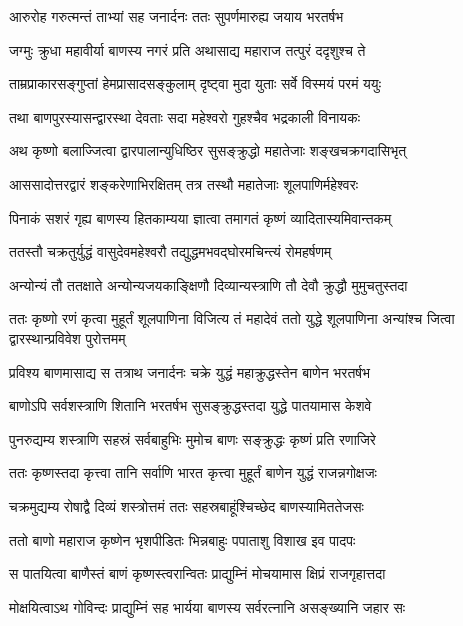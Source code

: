 \twolineshloka
{आरुरोह गरुत्मन्तं ताभ्यां सह जनार्दनः}
{ततः सुपर्णमारुह्य जयाय भरतर्षभ}


\twolineshloka
{जग्मुः क्रुधा महावीर्या बाणस्य नगरं प्रति}
{अथासाद्य महाराज तत्पुरं ददृशुश्च ते}


\twolineshloka
{ताम्रप्राकारसङ्गुप्तां हेमप्रासादसङ्कुलाम्}
{दृष्ट्वा मुदा युताः सर्वे विस्मयं परमं ययुः}


\twolineshloka
{तथा बाणपुरस्यासन्द्वारस्था देवताः सदा}
{महेश्वरो गुहश्चैव भद्रकाली विनायकः}


\twolineshloka
{अथ कृष्णो बलाज्जित्वा द्वारपालान्युधिष्ठिर}
{सुसङ्क्रुद्धो महातेजाः शङ्खचक्रगदासिभृत्}


\twolineshloka
{आससादोत्तरद्वारं शङ्करेणाभिरक्षितम्}
{तत्र तस्थौ महातेजाः शूलपाणिर्महेश्वरः}


\twolineshloka
{पिनाकं सशरं गृह्य बाणस्य हितकाम्यया}
{ज्ञात्वा तमागतं कृष्णं व्यादितास्यमिवान्तकम्}


\twolineshloka
{ततस्तौ चक्रतुर्युद्धं वासुदेवमहेश्वरौ}
{तद्युद्धमभवद्घोरमचिन्त्यं रोमहर्षणम्}


\twolineshloka
{अन्योन्यं तौ ततक्षाते अन्योन्यजयकाङ्क्षिणौ}
{दिव्यान्यस्त्राणि तौ देवौ क्रुद्धौ मुमुचतुस्तदा}


\threelineshloka
{ततः कृष्णो रणं कृत्वा मुहूर्तं शूलपाणिना}
{विजित्य तं महादेवं ततो युद्धे शूलपाणिना}
{अन्यांश्च जित्वा द्वारस्थान्प्रविवेश पुरोत्तमम्}


\threelineshloka
{प्रविश्य बाणमासाद्य स तत्राथ जनार्दनः}
{चक्रे युद्धं महाक्रुद्धस्तेन बाणेन भरतर्षभ}
{}


\twolineshloka
{बाणोऽपि सर्वशस्त्राणि शितानि भरतर्षभ}
{सुसङ्क्रुद्धस्तदा युद्धे पातयामास केशवे}


\twolineshloka
{पुनरुद्यम्य शस्त्राणि सहस्रं सर्वबाहुभिः}
{मुमोच बाणः सङ्क्रुद्धः कृष्णं प्रति रणाजिरे}


\twolineshloka
{ततः कृष्णस्तदा कृत्त्वा तानि सर्वाणि भारत}
{कृत्त्वा मुहूर्तं बाणेन युद्धं राजन्नगोक्षजः}


\twolineshloka
{चक्रमुद्यम्य रोषाद्वै दिव्यं शस्त्रोत्तमं ततः}
{सहस्रबाहूंश्चिच्छेद बाणस्यामिततेजसः}


\twolineshloka
{ततो बाणो महाराज कृष्णेन भृशपीडितः}
{भिन्नबाहुः पपाताशु विशाख इव पादपः}


\twolineshloka
{स पातयित्वा बाणैस्तं बाणं कृष्णस्त्वरान्वितः}
{प्राद्युम्निं मोचयामास क्षिप्रं राजगृहात्तदा}


\twolineshloka
{मोक्षयित्वाऽथ गोविन्दः प्राद्युम्निं सह भार्यया}
{बाणस्य सर्वरत्नानि असङ्ख्यानि जहार सः}


